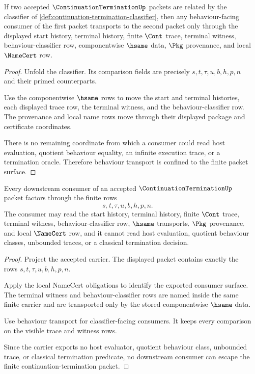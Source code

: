 \begin{theorem}
\label{thm:continuation-termination-behavior-transport}
If two accepted $\ContinuationTerminationUp$ packets are related by the classifier of \autoref{def:continuation-termination-classifier}, then any behaviour-facing consumer of the first packet transports to the second packet only through the displayed start history, terminal history, finite $\Cont$ trace, terminal witness, behaviour-classifier row, componentwise $\hsame$ data, $\Pkg$ provenance, and local $\NameCert$ row.
\end{theorem}
\begin{proof}
Unfold the classifier. Its comparison fields are precisely $s,t,\tau,u,b,h,p,n$ and their primed counterparts.

Use the componentwise $\hsame$ rows to move the start and terminal histories, each displayed trace row, the terminal witness, and the behaviour-classifier row. The provenance and local name rows move through their displayed package and certificate coordinates.

There is no remaining coordinate from which a consumer could read host evaluation, quotient behaviour equality, an infinite execution trace, or a termination oracle. Therefore behaviour transport is confined to the finite packet surface.
\end{proof}

\begin{theorem}
\label{thm:continuation-termination-nonescape}
Every downstream consumer of an accepted $\ContinuationTerminationUp$ packet factors through the finite rows
$$
s,t,\tau,u,b,h,p,n.
$$
The consumer may read the start history, terminal history, finite $\Cont$ trace, terminal witness, behaviour-classifier row, $\hsame$ transports, $\Pkg$ provenance, and local $\NameCert$ row, and it cannot read host evaluation, quotient behaviour classes, unbounded traces, or a classical termination decision.
\end{theorem}
\begin{proof}
Project the accepted carrier. The displayed packet contains exactly the rows $s,t,\tau,u,b,h,p,n$.

Apply the local NameCert obligations to identify the exported consumer surface. The terminal witness and behaviour-classifier rows are named inside the same finite carrier and are transported only by the stored componentwise $\hsame$ data.

Use behaviour transport for classifier-facing consumers. It keeps every comparison on the visible trace and witness rows.

Since the carrier exports no host evaluator, quotient behaviour class, unbounded trace, or classical termination predicate, no downstream consumer can escape the finite continuation-termination packet.
\end{proof}

